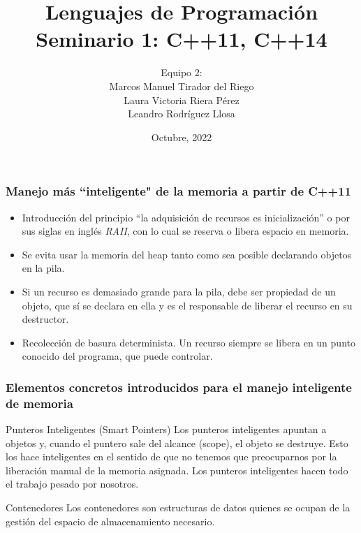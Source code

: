 \documentclass{beamer}
\title{Lenguajes de Programaci\'on\\
\textbf{Seminario 1: C++11, C++14}}
\author{Equipo 2:\\
	Marcos Manuel Tirador del Riego\\ 
	Laura Victoria Riera P\'erez\\
	Leandro Rodr\'iguez Llosa}
\institute{Ciencias de la computaci\'on}
\date{Octubre, 2022}
\begin{document}
	\frame{\titlepage}
	

	\begin{frame}
		\frametitle{Manejo más ``inteligente" de la memoria a partir de C++11}
		
		\begin{itemize}
			\item Introducci\'on del principio ``la adquisición de recursos es inicialización'' o por sus siglas en ingl\'es \textit{RAII}, con lo cual se reserva o libera espacio en memoria. 
			
			\item Se evita usar la memoria del heap tanto como sea posible declarando objetos en la pila. 
			
			\item Si un recurso es demasiado grande para la pila, debe ser propiedad de un objeto, que s\'i se declara en ella y es el responsable de liberar el recurso en su destructor. 
			
			\item Recolecci\'on de basura determinista. Un recurso siempre se libera en un punto conocido del programa, que puede controlar.
		\end{itemize}
	\end{frame}
	
	\begin{frame}
		\frametitle{Elementos concretos introducidos para el manejo inteligente de memoria}
		
		\begin{block}{Punteros Inteligentes (Smart Pointers)}
	 		Los punteros inteligentes apuntan a objetos y, cuando el puntero sale del alcance (scope), el objeto se destruye. Esto los hace inteligentes en el sentido de que no tenemos que preocuparnos por la liberaci\'on manual de la memoria asignada. Los punteros inteligentes hacen todo el trabajo pesado por nosotros.
		\end{block}
		
		\begin{block}{Contenedores}
			Los contenedores son estructuras de datos quienes se ocupan de la gestión del espacio de almacenamiento necesario.
		\end{block}
	
	\end{frame}
	
\end{document}
